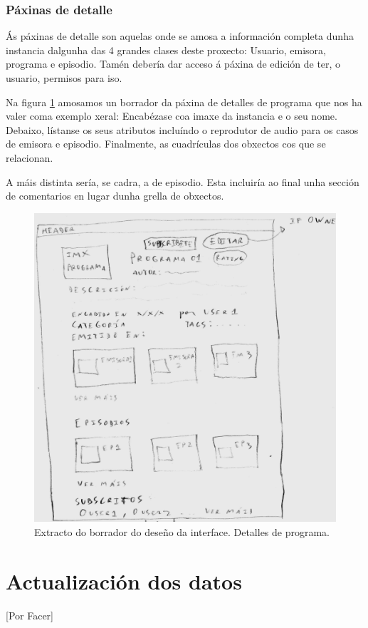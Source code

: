 \subsubsection{Páxinas de detalle}

Ás páxinas de detalle son aquelas onde se amosa a información completa dunha instancia dalgunha das 4 grandes clases deste proxecto: Usuario, emisora, programa e episodio. Tamén debería dar acceso á páxina de edición de ter, o usuario, permisos para iso.

Na figura \ref{fig:program1_p} amosamos un borrador da páxina de detalles de programa que nos ha valer coma exemplo xeral: Encabézase coa imaxe da instancia e o seu nome. Debaixo, lístanse os seus atributos incluíndo o reprodutor de audio para os casos de emisora e episodio. Finalmente, as cuadrículas dos obxectos cos que se relacionan.

A máis distinta sería, se cadra, a de episodio. Esta incluiría ao final unha sección de comentarios en lugar dunha grella de obxectos.

\begin{figure}[h]
	\centering
	\includegraphics[scale=0.2,keepaspectratio=true]{./images/program1_p.png}
	\caption{Extracto do borrador do deseño da interface. Detalles de programa.}
	\label{fig:program1_p}
\end{figure}


\section{Actualización dos datos}
\label{daemon_desenho}
[Por Facer]